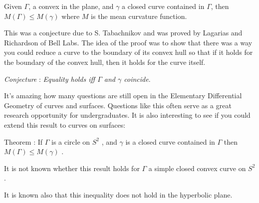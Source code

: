 \documentclass[12pt]{article}
\begin{document}
Given $\Gamma$, a convex  in the plane, and $\gamma$ a closed curve contained in $\Gamma$, then $M(\Gamma) \leq M(\gamma)$ where $M$ is the mean curvature function.

This was a conjecture due to S. Tabachnikov and was proved by Lagarias and Richardson of Bell Labs. The idea of the proof was to show that there was a way you could reduce a curve to the boundary of its convex hull so that if it holds for the boundary of the convex hull, then it holds for the curve itself.

\emph{Conjecture} : \emph{Equality holds iff $ \Gamma$ and $\gamma $ coincide}.

It's amazing how many questions are still open in the Elementary Differential Geometry of curves and surfaces.  Questions like this often serve as a great research opportunity for undergraduates.  It is also interesting to see if you could extend this result to curves on surfaces:

Theorem : If $ \Gamma $ is a circle on $S^2$ , and $\gamma$ is a closed curve contained in $\Gamma$ then $M(\Gamma) \leq M(\gamma)$ .

It is not known whether this result holds for $\Gamma$ a simple closed convex curve on $S^2$.

It is known also that this inequality does not hold in the hyperbolic plane.
\end{document}
